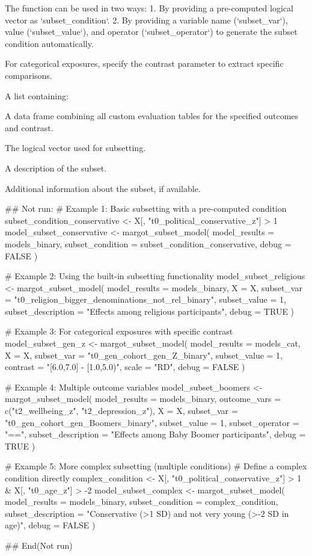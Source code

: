 \documentclass[a4paper]{book}
\begin{document}
%
\begin{Details}
The function can be used in two ways:
1. By providing a pre-computed logical vector as `subset\_condition`.
2. By providing a variable name (`subset\_var`), value (`subset\_value`), and operator (`subset\_operator`)
to generate the subset condition automatically.

For categorical exposures, specify the contrast parameter to extract specific comparisons.
\end{Details}
%
\begin{Value}
A list containing:
\begin{ldescription}
\item[\code{results}] A data frame combining all custom evaluation tables for the specified outcomes and contrast.
\item[\code{subset\_condition}] The logical vector used for subsetting.
\item[\code{subset\_description}] A description of the subset.
\item[\code{subset\_info}] Additional information about the subset, if available.
\end{ldescription}
\end{Value}
%
\begin{Examples}
\begin{ExampleCode}
## Not run: 
# Example 1: Basic subsetting with a pre-computed condition
subset_condition_conservative <- X[, "t0_political_conservative_z"] > 1
model_subset_conservative <- margot_subset_model(
  model_results = models_binary,
  subset_condition = subset_condition_conservative,
  debug = FALSE
)

# Example 2: Using the built-in subsetting functionality
model_subset_religious <- margot_subset_model(
  model_results = models_binary,
  X = X,
  subset_var = "t0_religion_bigger_denominations_not_rel_binary",
  subset_value = 1,
  subset_description = "Effects among religious participants",
  debug = TRUE
)

# Example 3: For categorical exposures with specific contrast
model_subset_gen_z <- margot_subset_model(
  model_results = models_cat,
  X = X,
  subset_var = "t0_gen_cohort_gen_Z_binary",
  subset_value = 1,
  contrast = "[6.0,7.0] - [1.0,5.0)",
  scale = "RD",
  debug = FALSE
)

# Example 4: Multiple outcome variables
model_subset_boomers <- margot_subset_model(
  model_results = models_binary,
  outcome_vars = c("t2_wellbeing_z", "t2_depression_z"),
  X = X,
  subset_var = "t0_gen_cohort_gen_Boomers_binary",
  subset_value = 1,
  subset_operator = "==",
  subset_description = "Effects among Baby Boomer participants",
  debug = TRUE
)

# Example 5: More complex subsetting (multiple conditions)
# Define a complex condition directly
complex_condition <- X[, "t0_political_conservative_z"] > 1 & X[, "t0_age_z"] > -2
model_subset_complex <- margot_subset_model(
  model_results = models_binary,
  subset_condition = complex_condition,
  subset_description = "Conservative (>1 SD) and not very young (>-2 SD in age)",
  debug = FALSE
)

## End(Not run)

\end{ExampleCode}
\end{Examples}
\end{document}
